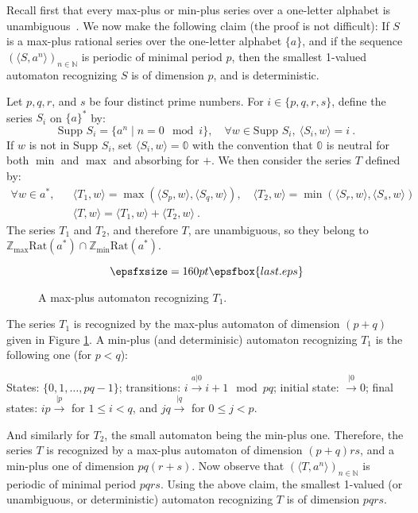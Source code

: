 \documentclass{article}
\newcommand{\supp}[1]{\text{Supp }#1}
\newcommand{\N} {\ensuremath{\mathbb{N}}}
\newcommand{\Z} {\ensuremath{\mathbb{Z}}}
\newcommand{\Zmin} {\Z_{\min}}
\newcommand{\Zmax} {\Z_{\max}}
\newcommand{\1}{\mathbb{1}}
\newcommand{\0}{\mathbb{0}}
\newcommand{\coef}[2]{\langle #1, #2\rangle}
\def\Rat{\text{Rat}}
\begin{document}
\medskip

Recall first that every max-plus or min-plus series over a one-letter alphabet is
unambiguous~\cite{BoKr,moll}.
We now make the following claim (the proof is not difficult): 
If $S$ is a max-plus rational series over the one-letter alphabet
$\{a\}$, and if the sequence $(\coef{S}{a^n})_{n\in \N}$ is periodic
of minimal period $p$, then the smallest 1-valued automaton
recognizing $S$ is of dimension $p$, and is deterministic. 

Let $p,q,r$, and $s$ be four distinct prime numbers. For $i\in \{p,q,r,s\}$,
define the series $S_i$ on $\{a\}^*$ by:
\[
\supp{S_i}=\{a^n\mid n=0\mod i\}, \quad \forall w \in \supp{S_i}, \ 
\coef{S_i}{w}=i\:.
\]
If $w$ is not in $\supp{S_i}$, set
$\coef{S_i}{w}=\mathbb{0}$ with the convention that $\mathbb{0}$
is neutral for both $\min$ and $\max$ and absorbing for $+$.
We then consider the series $T$ defined by:
\begin{eqnarray*}
\forall w\in a^*,&& \coef{T_1}{w}= \max(\coef{S_p}{w},\coef{S_q}{w}),
\quad \coef{T_2}{w} = \min(\coef{S_r}{w},\coef{S_s}{w})\\
&&  \coef{T}{w}=\coef{T_1}{w} + \coef{T_2}{w} \:.
\end{eqnarray*}
The series $T_1$ and $T_2$, and therefore $T$, are unambiguous, so
they belong to $\Zmax\Rat(a^*)\cap \Zmin\Rat(a^*)$. 
\begin{figure}[ht]
\[\epsfxsize=160pt \epsfbox{last.eps} \]
\caption{A max-plus automaton recognizing $T_1$.}\label{fi-last}
\end{figure}
The series $T_1$ is recognized by the max-plus
automaton of dimension $(p+q)$ given in Figure \ref{fi-last}. 
A min-plus (and determinisic) automaton recognizing $T_1$ is the
following one (for $p<q$): 

States: $\{0,1,\dots, pq-1\}$; transitions: $i
\stackrel{a|0}{\longrightarrow} i+1 \mod pq$; initial state:
$\stackrel{|0}{\rightarrow} 0$; final states:
$ip\stackrel{|p}{\rightarrow}$ for $1 \leq i<q$, and
$jq\stackrel{|q}{\rightarrow}$ for $0\leq j<p$.

\medskip

And similarly for $T_2$, the small
automaton being the min-plus one. 
Therefore, the series $T$ is recognized by a max-plus automaton of
dimension $(p+q)rs$, and a min-plus one of dimension $pq(r+s)$. Now
observe that $(\coef{T}{a^n})_{n\in \N}$ is periodic of minimal period $pqrs$. 
Using the above claim, the smallest 1-valued (or unambiguous, or
deterministic) automaton recognizing $T$ is of dimension $pqrs$. 
\end{document}

